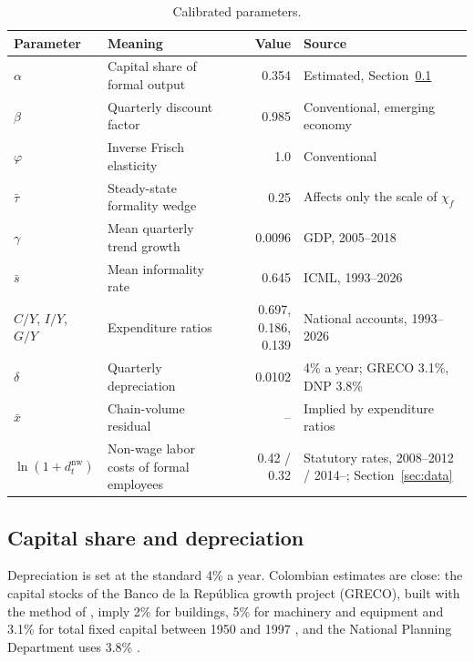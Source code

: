\begin{table}[H]
\centering
\caption{Calibrated parameters.}
\label{tab:calibration}
\footnotesize
\begin{tabularx}{\textwidth}{L{1.6cm} L{6.2cm} r Y}
\toprule
\textbf{Parameter} & \textbf{Meaning} & \textbf{Value} & \textbf{Source} \\
\midrule
$\alpha$ & Capital share of formal output & 0.354 & Estimated, Section~\ref{sec:alpha} \\
$\beta$ & Quarterly discount factor & 0.985 & Conventional, emerging economy \\
$\varphi$ & Inverse Frisch elasticity & 1.0 & Conventional \\
$\bar\tau$ & Steady-state formality wedge & 0.25 & Affects only the scale of $\chi_f$ \\
$\gamma$ & Mean quarterly trend growth & 0.0096 & GDP, 2005--2018 \\
$\bar s$ & Mean informality rate & 0.645 & ICML, 1993--2026 \\
$C/Y$, $I/Y$, $G/Y$ & Expenditure ratios & 0.697, 0.186, 0.139 & National accounts, 1993--2026 \\
$\delta$ & Quarterly depreciation & 0.0102 & 4\% a year; GRECO 3.1\%, DNP 3.8\% \\
$\bar x$ & Chain-volume residual & -- & Implied by expenditure ratios \\
$\ln(1+d_t^{\mathrm{nw}})$ & Non-wage labor costs of formal employees & 0.42 / 0.32 & Statutory rates, 2008--2012 / 2014--; Section~\ref{sec:data} \\
\bottomrule
\end{tabularx}
\end{table}

\subsection{Capital share and depreciation}
\label{sec:alpha}

Depreciation is set at the standard 4\% a year. Colombian estimates are close: the capital stocks of the Banco de la Rep\'ublica growth project (GRECO), built with the method of \citet{Barrios1993}, imply 2\% for buildings, 5\% for machinery and equipment and 3.1\% for total fixed capital between 1950 and 1997 \citep{GRECO1999}, and the National Planning Department uses 3.8\% \citep{RodriguezPerillaReyes2004}.

